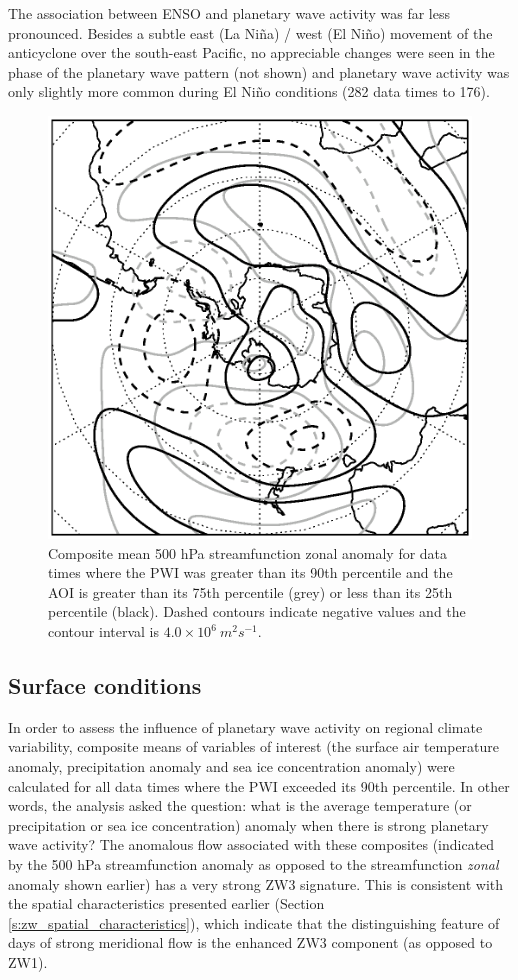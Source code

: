 The association between ENSO and planetary wave activity was far less pronounced. Besides a subtle east (La Ni\~{n}a) / west (El Ni\~{n}o) movement of the anticyclone over the south-east Pacific, no appreciable changes were seen in the phase of the planetary wave pattern (not shown) and planetary wave activity was only slightly more common during El Ni\~{n}o conditions (282 data times to 176).      

\begin{figure}
\begin{center}
\includegraphics[width=0.56\columnwidth]{figures/zonalwaves/sf-composite_samgt75pct-samlt25pct-pwigt90pct_ERAInterim_500hPa_030day-runmean_native-zonal-anom-shextropics15.eps}
\caption[Comparison of the composite mean 500 hPa streamfunction zonal anomaly for data times where the PWI was greater than its 90th percentile and the SAM was (a) positive and (b) negative]{\label{fig:sam_composite}
Composite mean 500 hPa streamfunction zonal anomaly for data times where the PWI was greater than its 90th percentile and the AOI is greater than its 75th percentile (grey) or less than its 25th percentile (black). Dashed contours indicate negative values and the contour interval is $4.0 \times 10^6 \: m^2 s^{-1}$.}
\end{center}
\end{figure}


\subsection{Surface conditions}\label{s:surface_conditions}

In order to assess the influence of planetary wave activity on regional climate variability, composite means of variables of interest (the surface air temperature anomaly, precipitation anomaly and sea ice concentration anomaly) were calculated for all data times where the PWI exceeded its 90th percentile. In other words, the analysis asked the question: what is the average temperature (or precipitation or sea ice concentration) anomaly when there is strong planetary wave activity? The anomalous flow associated with these composites (indicated by the 500 hPa streamfunction anomaly as opposed to the streamfunction \textit{zonal} anomaly shown earlier) has a very strong ZW3 signature. This is consistent with the spatial characteristics presented earlier (Section \ref{s:zw_spatial_characteristics}), which indicate that the distinguishing feature of days of strong meridional flow is the enhanced ZW3 component (as opposed to ZW1).  


